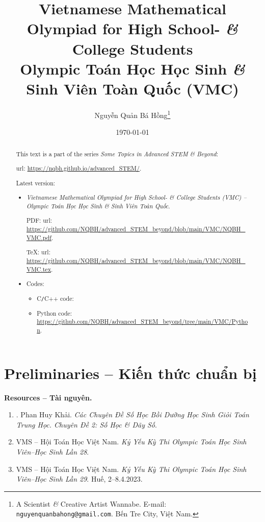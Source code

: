\documentclass{article}
\title{Vietnamese Mathematical Olympiad for High School- {\it\&} College Students\\Olympic Toán Học Học Sinh {\it\&} Sinh Viên Toàn Quốc (VMC)}
\author{Nguyễn Quản Bá Hồng\footnote{A Scientist {\it\&} Creative Artist Wannabe. E-mail: {\tt nguyenquanbahong@gmail.com}. Bến Tre City, Việt Nam.}}
\date{\today}
\begin{document}
\maketitle
\begin{abstract}
	This text is a part of the series {\it Some Topics in Advanced STEM \& Beyond}:
	
	{\sc url}: \url{https://nqbh.github.io/advanced_STEM/}.
	
	Latest version:
	\begin{itemize}
		\item {\it Vietnamese Mathematical Olympiad for High School- \& College Students (VMC) -- Olympic Toán Học Học Sinh \& Sinh Viên Toàn Quốc}.
		
		PDF: {\sc url}: \url{https://github.com/NQBH/advanced_STEM_beyond/blob/main/VMC/NQBH_VMC.pdf}.
		
		\TeX: {\sc url}: \url{https://github.com/NQBH/advanced_STEM_beyond/blob/main/VMC/NQBH_VMC.tex}.
		\item Codes:
		\begin{itemize}
			\item C{\tt/}C++ code:
			\item Python code: \url{https://github.com/NQBH/advanced_STEM_beyond/tree/main/VMC/Python}.
		\end{itemize}
	\end{itemize}
\end{abstract}
\tableofcontents


\section{Preliminaries -- Kiến thức chuẩn bị}

\textbf{\textsf{Resources -- Tài nguyên.}}
\begin{enumerate}
	\item \cite{Khai_so_hoc_day_so}. {\sc Phan Huy Khải}. {\it Các Chuyên Đề Số Học Bồi Dưỡng Học Sinh Giỏi Toán Trung Học. Chuyên Đề 2: Số Học \& Dãy Số}.
	\item {\sc VMS -- Hội Toán Học Việt Nam}. {\it Kỷ Yếu Kỳ Thi Olympic Toán Học Sinh Viên--Học Sinh Lần 28}.
	\item {\sc VMS -- Hội Toán Học Việt Nam}. {\it Kỷ Yếu Kỳ Thi Olympic Toán Học Sinh Viên--Học Sinh Lần 29}. Huế, 2--8.4.2023.
\end{enumerate}
\end{document}
